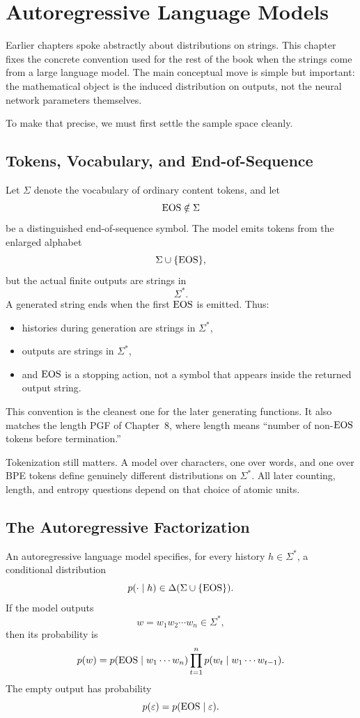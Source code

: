 \chapter{Autoregressive Language Models}
\label{ch10:top}

Earlier chapters spoke abstractly about distributions on strings. This chapter fixes the concrete convention used for the rest of the book when the strings come from a large language model. The main conceptual move is simple but important: the mathematical object is the induced distribution on outputs, not the neural network parameters themselves.

To make that precise, we must first settle the sample space cleanly.

\section{Tokens, Vocabulary, and End-of-Sequence}

Let $\Sigma$ denote the vocabulary of ordinary content tokens, and let
\[
  \operatorname{EOS} \notin \Sigma
\]
be a distinguished end-of-sequence symbol. The model emits tokens from the enlarged alphabet
\[
  \Sigma \cup \{\operatorname{EOS}\},
\]
but the actual finite outputs are strings in
\[
  \Sigma^*.
\]
A generated string ends when the first $\operatorname{EOS}$ is emitted. Thus:
\begin{itemize}
  \item histories during generation are strings in $\Sigma^*$,
  \item outputs are strings in $\Sigma^*$,
  \item and $\operatorname{EOS}$ is a stopping action, not a symbol that appears inside the returned output string.
\end{itemize}

This convention is the cleanest one for the later generating functions. It also matches the length PGF of Chapter~8, where length means ``number of non-$\operatorname{EOS}$ tokens before termination.''

Tokenization still matters. A model over characters, one over words, and one over BPE tokens define genuinely different distributions on $\Sigma^*$. All later counting, length, and entropy questions depend on that choice of atomic units.

\section{The Autoregressive Factorization}

An autoregressive language model specifies, for every history $h \in \Sigma^*$, a conditional distribution
\[
  p(\cdot \mid h) \in \Delta(\Sigma \cup \{\operatorname{EOS}\}).
\]
If the model outputs
\[
  w = w_1 w_2 \cdots w_n \in \Sigma^*,
\]
then its probability is
\[
  p(w) = p(\operatorname{EOS} \mid w_1\cdots w_n) \prod_{t=1}^n p(w_t \mid w_1\cdots w_{t-1}).
\]
The empty output has probability
\[
  p(\varepsilon) = p(\operatorname{EOS} \mid \varepsilon).
\]

